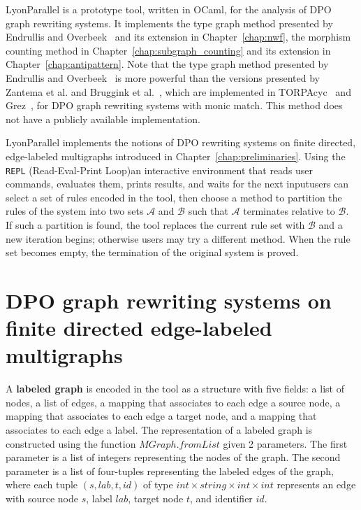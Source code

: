 LyonParallel is a prototype tool, written in OCaml, for the analysis of DPO graph rewriting systems.
It implements the type graph method presented by Endrullis and Overbeek~\cite{endrullis2024generalized_icgt} and its extension in Chapter~\ref{chap:nwf}, the morphism counting method in Chapter~\ref{chap:subgraph_counting} and its extension in Chapter~\ref{chap:antipattern}. Note that the type graph method presented by Endrullis and Overbeek~\cite{endrullis2024generalized_icgt} is more powerful than the versions presented by Zantema et al. and Bruggink et al.~\cite{zantema2014termination,bruggink2014termination,bruggink2015proving}, which are implemented in TORPAcyc~\cite{TORPAcyc} and Grez~\cite{grez}, for DPO graph rewriting systems with monic match. This method does not have a publicly available implementation.  

LyonParallel implements the notions of DPO rewriting systems on finite directed, edge-labeled multigraphs introduced in Chapter~\ref{chap:preliminaries}. Using the \texttt{REPL} (Read-Eval-Print Loop)\textemdash an interactive environment that reads user commands, evaluates them, prints results, and waits for the next input\textemdash users can select a set of rules encoded in the tool, then choose a method to partition the rules of the system into two sets $\mathcal{A}$ and $\mathcal{B}$ such that $\mathcal{A}$ terminates relative to $\mathcal{B}$. If such a partition is found, the tool replaces the current rule set with \(\mathcal{B}\) and a new iteration begins; otherwise users may try a different method. When the rule set becomes empty, the termination of the original system is proved.
\section{DPO graph rewriting systems on finite directed edge-labeled multigraphs}
\label{lyonparallel:sec:implementation_of_dpo_graph_rewriting_systems}
A \textbf{labeled graph} is encoded in the tool as a structure with five fields: a list of nodes, a list of edges, a mapping that associates to each edge a source node, a mapping that associates to each edge a target node, and a mapping that associates to each edge a label.
The representation of a labeled graph is constructed using the function \colorbox{Ivory2}{$MGraph.fromList$} given 2 parameters. The first parameter is a list of integers representing the nodes of the graph. The second parameter is a list of four-tuples representing the labeled edges of the graph, where each tuple \colorbox{Ivory2}{$(s,lab,t,id)$} of type \colorbox{Ivory2}{$\textit{int}\times \textit{string}\times \textit{int}\times \textit{int}$} represents an edge with source node $s$, label $lab$, target node $t$, and identifier $id$.

